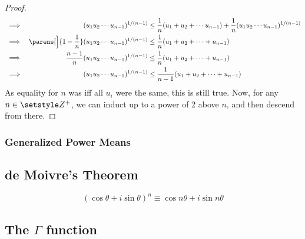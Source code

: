 \begin{proof}
\begin{alignat*}
&\implies& (u_1 u_2 \dotsm u_{n - 1})^{1 / (n - 1)} &\le
         \frac 1n (u_1 + u_2 + \dotsb u_{n - 1}) +
         \frac 1n (u_1 u_2 \dotsm u_{n - 1})^{1 / (n - 1)} \\
    &\implies& \parens[\Big]{1 - \frac 1n}
         (u_1 u_2 \dotsm u_{n - 1})^{1 / (n - 1)} &\le
         \frac 1n (u_1 + u_2 + \dotsb + u_{n - 1}) \\
&\implies& \frac {n - 1}n
         (u_1 u_2 \dotsb u_{n - 1})^{1 / (n - 1)} &\le
         \frac 1n (u_1 + u_2 + \dotsb + u_{n - 1}) \\
&\implies& (u_1 u_2 \dotsm u_{n - 1})^{1 / (n - 1)} &\le
         \frac 1{n - 1} (u_1 + u_2 + \dotsb + u_{n - 1})
\end{alignat*}
As equality for \(n\) was iff all \(u_i\) were the same, this is still true.
Now, for any \(n \in \Integers^+\), we can induct up to a power of 2 above
\(n\), and then descend from there.
\end{proof}

\subsubsection{Generalized Power Means}

\subsection{de Moivre's Theorem}

\begin{equation}
(\cos \theta + i \sin \theta)^n \equiv \cos n\theta + i \sin n\theta
\end{equation}

\subsection[The \texorpdfstring{\(\Gamma\)}{Gamma} function]
           {The \boldmath\(\Gamma\) function}

